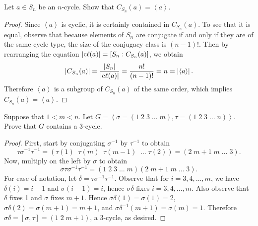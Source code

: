 \documentclass[10pt]{amsart}
\begin{document}
\begin{ex4}
  Let $a \in S_n$ be an $n$-cycle.  Show that $C_{S_n}(a) = \left< a \right>$.
  \begin{proof}
    Since $\left< a \right>$ is cyclic, it is certainly contained in $C_{S_n}(a)$.
    To see that it is equal, observe that because elements of $S_n$ are conjugate if and only if they are of the same cycle type, the size of the conjugacy class is $(n-1)!$.
    Then by rearranging the equation $\left| \operatorname{c\ell}(a) \right| = [S_n : C_{S_n}(a)]$, we obtain $$\left| C_{S_n}(a) \right| = \frac{\left| S_n \right|}{\left| \operatorname{c\ell}(a) \right|} = \frac{n!}{(n-1)!} = n = \left| \left<a\right> \right|.$$
    Therefore $\left<a\right>$ is a subgroup of $C_{S_n}(a)$ of the same order, which implies $C_{S_n}(a) = \left< a \right>$.
  \end{proof}
\end{ex4}

\begin{ex5}
  Suppose that $1 < m < n$.  Let $G = \left<\sigma = (1\; 2\; 3\; \ldots\; m), \tau = (1\; 2\; 3\; \ldots\; n)\right>$.
  Prove that $G$ contains a 3-cycle.
  \begin{proof}
    First, start by conjugating $\sigma^{-1}$ by $\tau^{-1}$ to obtain
    $$\tau\sigma^{-1}\tau^{-1} = (\tau(1)\;\; \tau(m)\;\; \tau(m-1)\;\; \ldots\; \tau(2)) =(2\; m+1\; m\; \ldots\; 3).$$
    Now, multiply on the left by $\sigma$ to obtain
    $$\sigma\tau\sigma^{-1}\tau^{-1} = (1\; 2\; 3\; \ldots\; m)(2\; m+1\; m\; \ldots\; 3).$$%
    For ease of notation, let $\delta = \tau\sigma^{-1}\tau^{-1}$.
    Observe that for $i = 3, 4, \ldots, m$, we have $\delta(i) = i-1$ and $\sigma(i-1) = i$, hence $\sigma\delta$ fixes $i = 3, 4, \ldots, m$.
	Also observe that $\delta$ fixes 1 and $\sigma$ fixes $m+1$.
    Hence $\sigma\delta(1) = \sigma(1) = 2$, $\sigma\delta(2) = \sigma(m+1) = m+1$, and $\sigma\delta^{-1}(m+1) = \sigma(m) = 1$.
    Therefore $\sigma\delta = [\sigma,\tau] = (1\; 2\; m+1)$, a 3-cycle, as desired.
  \end{proof}
\end{ex5}
\end{document}
